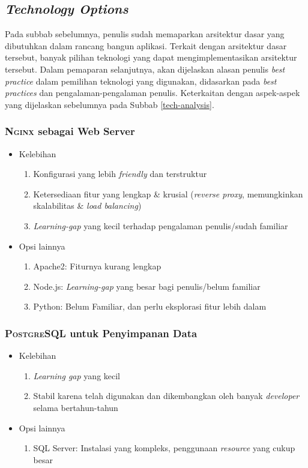 
\subsection{\textit{Technology Options}}
\label{tech-options}

	Pada subbab sebelumnya, penulis sudah memaparkan arsitektur dasar yang dibutuhkan dalam rancang bangun aplikasi. Terkait dengan arsitektur dasar tersebut, banyak pilihan teknologi yang dapat mengimplementasikan arsitektur tersebut. Dalam pemaparan selanjutnya, akan dijelaskan alasan penulis \textit{best practice} dalam pemilihan teknologi yang digunakan, didasarkan pada \textit{best practices} dan pengalaman-pengalaman penulis. Keterkaitan dengan aspek-aspek yang dijelaskan sebelumnya pada Subbab \ref{tech-analysis}.
	
	\subsubsection{\textsc{Nginx} sebagai Web Server}
		\begin{itemize}
			\item Kelebihan
				\begin{enumerate}
					\item Konfigurasi yang lebih \textit{friendly} dan terstruktur
					\item Ketersediaan fitur yang lengkap \& krusial (\textit{reverse proxy}, memungkinkan skalabilitas \& \textit{load balancing})
					\item \textit{Learning-gap} yang kecil terhadap pengalaman penulis/sudah familiar
				\end{enumerate}
			\item Opsi lainnya
				\begin{enumerate}
					\item Apache2:  Fiturnya kurang lengkap
					\item Node.js:  \textit{Learning-gap} yang besar bagi penulis/belum familiar
					\item Python:  Belum Familiar, dan perlu eksplorasi fitur lebih dalam
				\end{enumerate}
		\end{itemize}
	
	\subsubsection{\textsc{PostgreSQL} untuk Penyimpanan Data}
	\begin{itemize}
		\item Kelebihan
		\begin{enumerate}
			\item \textit{Learning gap} yang kecil
			\item Stabil karena telah digunakan dan dikembangkan oleh banyak \textit{developer} selama bertahun-tahun
		\end{enumerate}
		\item Opsi lainnya
		\begin{enumerate}
			\item SQL Server:  Instalasi yang kompleks, penggunaan \textit{resource} yang cukup besar
		\end{enumerate}
	\end{itemize}
	
